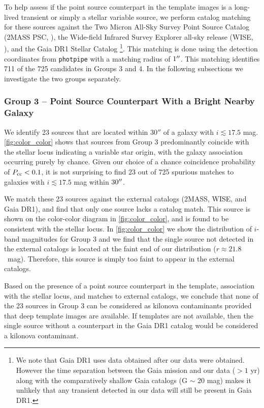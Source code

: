 To help assess if the point source counterpart in the template images is a long-lived transient or simply a stellar variable source, we perform catalog matching for these sources against the Two Micron All-Sky Survey Point Source Catalog (2MASS PSC, \citealt{2MASS}), the Wide-field Infrared Survey Explorer all-sky release (WISE, \citealt{WISE}), and the Gaia DR1 Stellar Catalog \citep{gaia1,gaia2}\footnote{We note that Gaia DR1 uses data obtained after our data were obtained. However the time separation between the Gaia mission and our data ($> 1$ yr) along with the comparatively shallow Gaia catalogs (G $\sim$ 20 mag) makes it unlikely that any transient detected in our data will still be present in Gaia DR1.}. This matching is done using the detection coordinates from {\tt photpipe} with a matching radius of $1\hbox{$^{\prime\prime}$}$. This matching identifies 711 of the 725 candidates in Groups 3 and 4. In the following subsections we investigate the two groups separately.

\subsubsection{Group 3 -- Point Source Counterpart With a Bright Nearby Galaxy}
\label{sec:group3}

We identify 23 sources that are located within $30''$ of a galaxy with $i\lesssim 17.5$ mag. \autoref{fig:color_color} shows that sources from Group 3 predominantly coincide with the stellar locus indicating a variable star origin, with the galaxy association occurring purely by chance. Given our choice of a chance coincidence probability of $P_{\rm cc} < 0.1$, it is not surprising to find 23 out of 725 spurious matches to galaxies with $i \lesssim 17.5$ mag within $30\hbox{$^{\prime\prime}$}$.

We match these 23 sources against the external catalogs (2MASS, WISE, and Gaia DR1), and find that only one source lacks a catalog match. This source is shown on the color-color diagram in \autoref{fig:color_color}, and is found to be consistent with the stellar locus. In \autoref{fig:color_color} we show the distribution of $i$-band magnitudes for Group 3 and we find that the single source not detected in the external catalogs is located at the faint end of our distribution ($r \approx 21.8$~mag). Therefore, this source is simply too faint to appear in the external catalogs.

Based on the presence of a point source counterpart in the template, association with the stellar locus, and matches to external catalogs, we conclude that none of the 23 sources in Group 3 can be considered as kilonova contaminants provided that deep template images are available. If templates are not available, then the single source without a counterpart in the Gaia DR1 catalog would be considered a kilonova contaminant.


